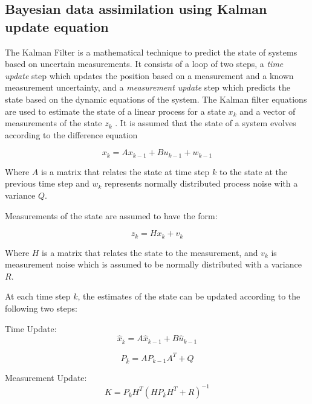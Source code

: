 \subsection{Bayesian data assimilation using Kalman update equation}\label{subsec:Kalman-update}

The Kalman Filter is a mathematical technique to predict the state of systems based on uncertain measurements. It consists of a loop of two steps, a \emph{time update} step which updates the position based on a measurement and a known measurement uncertainty, and a \emph{measurement update} step which predicts the state based on the dynamic equations of the system. The Kalman filter equations are used to estimate the state of a linear process for a state $x_k$ and a vector of measurements of the state $z_k$ \parencite{Welch2021a}.  It is assumed that the state of a system evolves according to the difference equation

\begin{equation}
 x_k = Ax_{k-1} + Bu_{k-1} + w_{k-1}   
\end{equation}

Where $A$ is a matrix that relates the state at time step $k$ to the state at the previous time step and $w_k$ represents normally distributed process noise with a variance $Q$.  

Measurements of the state are assumed to have the form:

\begin{equation}
    z_k = Hx_k + v_k
\end{equation}

Where $H$ is a matrix that relates the state to the measurement, and  $v_k$ is measurement noise which is assumed to be normally distributed with a variance $R$.

At each time step $k$, the estimates of the state can be updated according to the following two steps:

Time Update:
\begin{equation}\label{eq:timeup1}
    \hat{x}_{\bar{k}} = A\hat{x}_{k-1} + B\hat{u}_{k-1}
\end{equation}

\begin{equation}\label{eq:timeup2}
    P_{\bar{k}} = A P_{k-1} A^T + Q
\end{equation}

Measurement Update:
\begin{equation}\label{eq:kalmangain}
    K = P_{\bar{k}} H^T(H P_{\bar{k}} H^T + R) ^{-1}
\end{equation}

